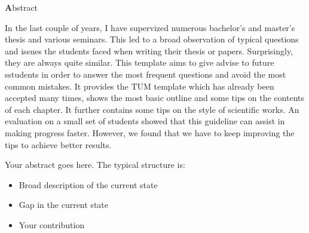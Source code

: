 \vspace*{2cm}

\begin{center}
{ \textbf Abstract}
\end{center}
\noindent

In the last couple of years, I have supervized numerous bachelor's and master's
thesis and various seminars. This led to a broad observation of typical
questions and issues the students faced when writing their thesis or papers.
Surprisingly, they are always quite similar. This template aims to give advise
to future sstudents in order to answer the most frequent questions and avoid the
most common mistakes. It provides the TUM template which has already been
accepted many times, shows the most basic outline and some tips on the contents
of each chapter. It further contains some tips on the style of scientific works.
An evaluation on a small set of students showed that this guideline can assist
in making progress faster. However, we found that we have to keep improving the
tips to achieve better results.

Your abstract goes here. The typical structure is:
\begin{itemize}
\item Broad description of the current state
\item Gap in the current state
\item Your contribution
\end{itemize}
